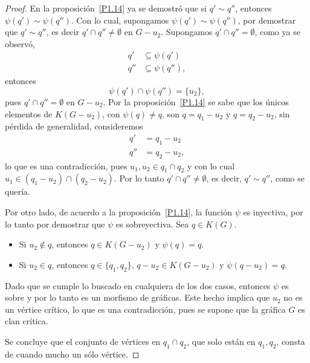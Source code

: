 \documentclass[12pt]{book}
\theoremstyle{definition}
\begin{document}
\begin{proof}
En la proposición~\ref{P1.14} ya se demostró que si $q'\sim q''$, entonces $\psi(q')\sim\psi(q'')$. Con lo cual, supongamos $\psi(q')\sim\psi(q'')$, por demostrar que $q'\sim q''$, es decir $q'\cap q''\neq\emptyset$ en $G-u_2$. Supongamos $q'\cap q''=\emptyset$, como ya se observó,
\begin{equation*}
\begin{aligned}
q' &\subseteq \psi(q') \\
q'' &\subseteq \psi(q''),
\end{aligned}
\end{equation*}
entonces
\begin{equation*}
\psi(q')\cap \psi(q'')=\{u_2\},
\end{equation*}
pues $q'\cap q''=\emptyset$ en $G-u_2$. Por la proposición~\ref{P1.14} se sabe que los únicos elementos de $K(G-u_2)$, con $\psi(q)\neq q$, son $q=q_1-u_2$ y $q=q_2-u_2$, sin pérdida de generalidad, consideremos 
\begin{equation*}
\begin{aligned}
q' &= q_1-u_2 \\
q'' &= q_2-u_2,
\end{aligned}
\end{equation*}
lo que es una contradicción, pues $u_1,u_2\in q_1\cap q_2$ y con lo cual $u_1\in (q_1-u_2)\cap (q_2-u_2)$. Por lo tanto $q'\cap q''\neq\emptyset$, es decir, $q'\sim q''$, como se quería.

Por otro lado, de acuerdo a la proposición~\ref{P1.14}, la función $\psi$ es inyectiva, por lo tanto por demostrar que $\psi$ es sobreyectiva. Sea $q\in K(G)$. 
\begin{itemize}
\item Si $u_2\notin q$, entonces $q\in K(G-u_2)$ y $\psi(q)=q$.
\item Si $u_2\in q$, entonces $q\in \{q_1,q_2\}$, $q-u_2\in K(G-u_2)$ y $\psi(q-u_2)=q$.
\end{itemize}
Dado que se cumple lo buscado en cualquiera de los dos casos, entonces $\psi$ es sobre y por lo tanto es un morfismo de gráficas. Este hecho implica que $u_2$ no es un vértice crítico, lo que es una contradicción, pues se supone que la gráfica $G$ es clan crítica.

Se concluye que el conjunto de vértices en $q_1\cap q_2$, que solo están en $q_1,q_2$, consta de cuando mucho un sólo vértice.
\end{proof}
\end{document}
